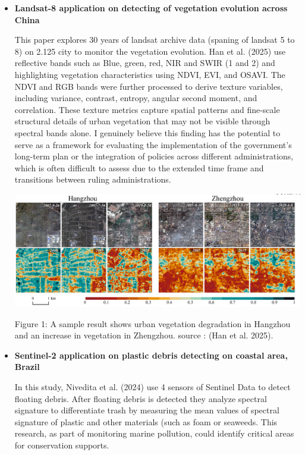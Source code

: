 \documentclass[
  letterpaper,
  DIV=11,
  numbers=noendperiod]{scrreprt}
\begin{document}
\begin{itemize}
\item
  \textbf{Landsat-8 application on detecting of vegetation evolution
  across China}

  This paper explores 30 years of landsat archive data (spaning of
  landsat 5 to 8) on 2.125 city to monitor the vegetation evolution. Han
  et al. (2025) use reflective bands such as Blue, green, red, NIR and
  SWIR (1 and 2) and highlighting vegetation characteristics using NDVI,
  EVI, and OSAVI. The NDVI and RGB bands were further processed to
  derive texture variables, including variance, contrast, entropy,
  angular second moment, and correlation. These texture metrics capture
  spatial patterns and fine-scale structural details of urban vegetation
  that may not be visible through spectral bands alone. I genuinely
  believe this finding has the potential to serve as a framework for
  evaluating the implementation of the government's long-term plan or
  the integration of policies across different administrations, which is
  often difficult to assess due to the extended time frame and
  transitions between ruling administrations.

  \includegraphics[width=6.96875in,height=\textheight]{images/clipboard-1072383063.png}

  Figure 1: A sample result shows urban vegetation degradation in
  Hangzhou and an increase in vegetation in Zhengzhou. source : (Han et
  al. 2025).
\item
  \textbf{Sentinel-2 application on plastic debris detecting on coastal
  area, Brazil}

  In this study, Nivedita et al. (2024) use 4 sensors of Sentinel Data
  to detect floating debris. After floating debris is detected they
  analyze spectral signature to differentiate trash by measuring the
  mean values of spectral signature of plastic and other materials (such
  as foam or seaweeds. This research, as part of monitoring marine
  pollution, could identify critical areas for conservation supports.


\end{itemize}
\end{document}
